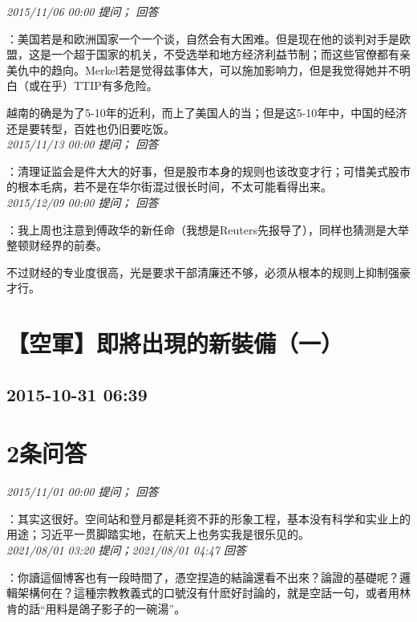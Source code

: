 \documentclass[twocolumn]{ctexart}
\begin{document}
\textit{\hfill\noindent\small 2015/11/06 00:00 提问； 回答}

：美国若是和欧洲国家一个一个谈，自然会有大困难。但是现在他的谈判对手是欧盟，这是一个超于国家的机关，不受选举和地方经济利益节制；而这些官僚都有亲美仇中的趋向。Merkel若是觉得兹事体大，可以施加影响力，但是我觉得她并不明白（或在乎）TTIP有多危险。

越南的确是为了5-10年的近利，而上了美国人的当；但是这5-10年中，中国的经济还是要转型，百姓也仍旧要吃饭。\\

\textit{\hfill\noindent\small 2015/11/13 00:00 提问； 回答}

：清理证监会是件大大的好事，但是股市本身的规则也该改变才行；可惜美式股市的根本毛病，若不是在华尔街混过很长时间，不太可能看得出来。\\

\textit{\hfill\noindent\small 2015/12/09 00:00 提问； 回答}

：我上周也注意到傅政华的新任命（我想是Reuters先报导了），同样也猜测是大举整顿财经界的前奏。

不过财经的专业度很高，光是要求干部清廉还不够，必须从根本的规则上抑制强豪才行。\\


\section{【空軍】即將出現的新裝備（一）}
\subsection{2015-10-31 06:39}


\section{2条问答}

\textit{\hfill\noindent\small 2015/11/01 00:00 提问； 回答}

：其实这很好。空间站和登月都是耗资不菲的形象工程，基本没有科学和实业上的用途；习近平一贯脚踏实地，在航天上也务实我是很乐见的。\\

\textit{\hfill\noindent\small 2021/08/01 03:20 提问；2021/08/01 04:47 回答}

：你讀這個博客也有一段時間了，憑空捏造的結論還看不出來？論證的基礎呢？邏輯架構何在？這種宗教教義式的口號沒有什麽好討論的，就是空話一句，或者用林肯的話“用料是鴿子影子的一碗湯”。
\\
\end{document}
